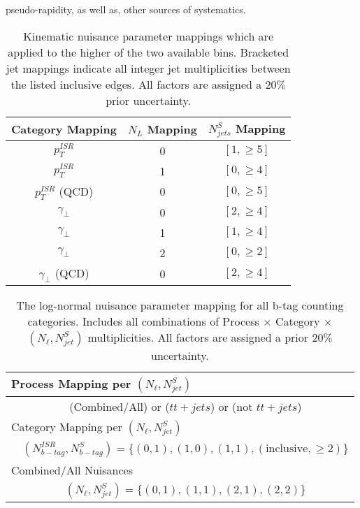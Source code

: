 pseudo-rapidity, as well as, other sources of systematics.

\begin{table}
\centering
\caption{Kinematic nuisance parameter mappings which are applied to the higher of the two available bins. Bracketed jet mappings indicate all integer jet multiplicities between the listed inclusive edges. All factors are assigned a $20\%$ prior uncertainty.}
\begin{tabular}{ccc}
\hline 
Category Mapping & $N_L$ Mapping & $N_{jets}^S$  Mapping \\ 
\hline 
\hline
$p_T^{ISR}$  & 0 & $[1,\geq5]$ \\ 
$p_T^{ISR}$ & 1 & $[0,\geq4]$ \\ 
$p_T^{ISR}$ (QCD) & 0 & $[0,\geq5]$ \\ 
$\gamma_\perp$ & 0 & $[2,\geq4]$ \\ 
$\gamma_\perp$ & 1 & $[1,\geq4]$ \\ 
$\gamma_\perp$ & 2 & $[0,\geq2]$ \\  
$\gamma_\perp$ (QCD) & 0 & $[2,\geq4]$ \\ 
\hline 
\end{tabular} 
\label{tab:kinnuisance}
\end{table}


\begingroup

\begin{table}
\centering
\caption{The log-normal nuisance parameter mapping for all b-tag counting categories. Includes all combinations of Process $\times$ Category $\times$ $(N_\ell,N_{jet}^S)$ multiplicities. All factors are assigned a prior $20\%$ uncertainty.}
\setlength{\tabcolsep}{10pt} %
\renewcommand{\arraystretch}{1.5} %
\begin{tabular}{lc}

\multicolumn{2}{|l}{Process Mapping per $(N_\ell,N_{jet}^S)$ } \\ 
\hline 
 & (Combined/All) or ($tt+jets$) or (not $tt+jets$)  \\ 
\multicolumn{2}{|l}{Category Mapping per $(N_\ell,N_{jet}^S)$ } \\ 
\hline 
 & $(N_{b-tag}^{ISR},N_{b-tag}^S)=\{(0,1),(1,0),(1,1),( \text{inclusive} ,\geq2) \}$ \\ 
\multicolumn{2}{|l}{Combined/All Nuisances}  \\ 
\hline 
 & $(N_\ell,N_{jet}^S)=\{(0,1),(1,1),(2,1),(2,2) \}$ \\ 

\end{tabular} 
\label{tab:btagnuisance}
\end{table}
\endgroup

